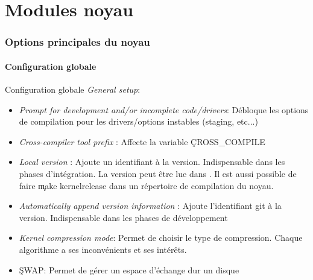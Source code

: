 %
%

\part{Modules noyau}

\begin{frame}
  \partpage
\end{frame}

\begin{frame}
  \tableofcontents
\end{frame}


\section{Options principales du noyau}

\subsection{Configuration globale}

\begin{frame}[fragile=singleslide]{Configuration globale}
  \emph{General setup}:
  \begin{itemize}
  \item \emph{Prompt for  development and/or incomplete code/drivers}:
    Débloque  les  options  de  compilation  pour  les  drivers/options
    instables (staging, etc...)
  \item  \emph{Cross-compiler  tool  prefix}  :  Affecte  la  variable
    \c{CROSS_COMPILE}
  \item   \emph{Local  version}   :   Ajoute  un   identifiant  à   la
    version. Indispensable  dans les phases  d'intégration. La version
    peut être lue dans  . Il est aussi possible de
    faire \c{make kernelrelease} dans  un répertoire de compilation du
    noyau.
  \item  \emph{Automatically  append  version  information}  :  Ajoute
    l'identifiant git  à la version. Indispensable dans  les phases de
    développement
  \item \emph{Kernel  compression mode}: Permet de choisir  le type de
    compression.   Chaque  algorithme   a  ses  inconvénients  et  ses
    intérêts.
  \item \c{SWAP}: Permet de gérer un espace d'échange dur un disque
  \end{itemize}
\end{frame}

